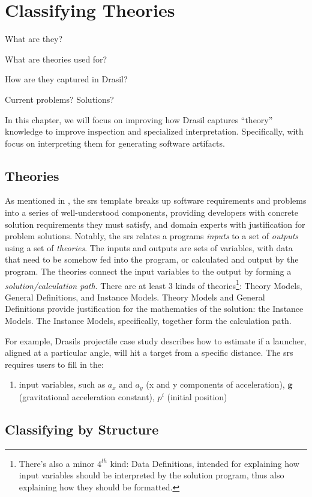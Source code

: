 \chapter*{Classifying Theories}
\label{chap:framing-theories}

\begin{writingdirectives}
    \item What are they?
    \item What are theories used for?
    \item How are they captured in Drasil?
    \item Current problems? Solutions?
\end{writingdirectives}

In this chapter, we will focus on improving how Drasil captures ``theory''
knowledge to improve inspection and specialized interpretation. Specifically,
with focus on interpreting them for generating software artifacts.

\section{Theories}
\label{chap:framing-theories:sec:theories}

As mentioned in , the \acs{srs} template
\cite{SmithAndLai2005} breaks up software requirements and problems into a
series of well-understood components, providing developers with concrete
solution requirements they must satisfy, and domain experts with justification
for problem solutions. Notably, the \acs{srs} relates a programs \textit{inputs}
to a set of \textit{outputs} using a set of \textit{theories}. The inputs and
outputs are sets of variables, with data that need to be somehow fed into the
program, or calculated and output by the program. The theories connect the input
variables to the output by forming a \textit{solution/calculation path}. There
are at least 3 kinds of theories\footnote{There's also a minor $4^{th}$ kind:
Data Definitions, intended for explaining how input variables should be
interpreted by the solution program, thus also explaining how they should be
formatted.}: Theory Models, General Definitions, and Instance Models. Theory
Models and General Definitions provide justification for the mathematics of the
solution: the Instance Models. The Instance Models, specifically, together form
the calculation path.

For example, Drasils \acs{projectile} case study describes how to estimate if a
launcher, aligned at a particular angle, will hit a target from a specific
distance. The \acs{srs} requires users to fill in the:
\begin{enumerate}
    \item input variables, such as \(a_x\) and \(a_y\) (x and y components of
    acceleration), \(\mathbf{g}\) (gravitational acceleration constant),
    \(p^{i}\) (initial position)
\end{enumerate}

\section{Classifying by Structure}
\label{chap:framing-theories:sec:classifying-and-structuring}
